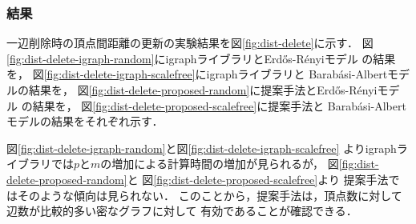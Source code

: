 \subsubsection*{結果}
一辺削除時の頂点間距離の更新の実験結果を図\ref{fig:dist-delete}に示す．
図\ref{fig:dist-delete-igraph-random}にigraphライブラリとErd\H{o}s-R{\'e}nyiモデル
の結果を，
図\ref{fig:dist-delete-igraph-scalefree}にigraphライブラリと
Barab{\'a}si-Albertモデルの結果を，
図\ref{fig:dist-delete-proposed-random}に提案手法とErd\H{o}s-R{\'e}nyiモデル
の結果を，
図\ref{fig:dist-delete-proposed-scalefree}に提案手法と
Barab{\'a}si-Albertモデルの結果をそれぞれ示す．

図\ref{fig:dist-delete-igraph-random}と図\ref{fig:dist-delete-igraph-scalefree}
よりigraphライブラリでは$p$と$m$の増加による計算時間の増加が見られるが，
図\ref{fig:dist-delete-proposed-random}と
図\ref{fig:dist-delete-proposed-scalefree}より
提案手法ではそのような傾向は見られない．
このことから，提案手法は，頂点数に対して辺数が比較的多い密なグラフに対して
有効であることが確認できる．

